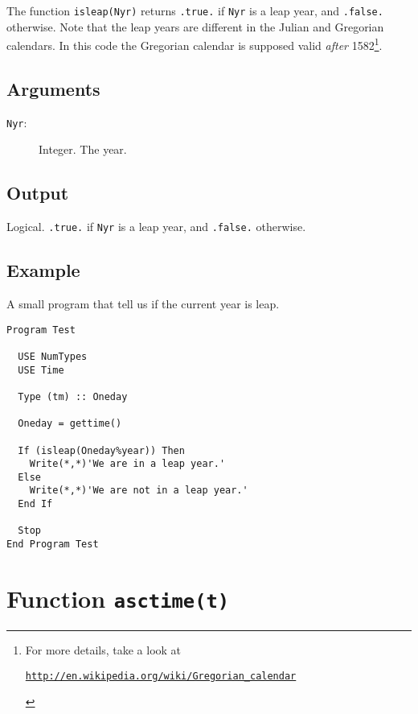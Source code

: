 The function \texttt{isleap(Nyr)} returns \texttt{.true.} if \texttt{Nyr}
is a leap year, and \texttt{.false.} otherwise. Note that the leap
years are different in the Julian and Gregorian calendars. In this
code the Gregorian calendar is supposed valid \emph{after} 1582\footnote{For
more details, take a look at 
\begin{center}
\href{http://en.wikipedia.org/wiki/Gregorian_calendar}{\texttt{http://en.wikipedia.org/wiki/Gregorian\_calendar}}  
\end{center}
}. 

\subsection{Arguments}

\begin{description}
\item[\texttt{Nyr}: ] Integer. The year.
\end{description}

\subsection{Output}

Logical.  \texttt{.true.} if \texttt{Nyr} is a leap year, and
\texttt{.false.} otherwise. 

\subsection{Example}

A small program that tell us if the current year is leap.

\begin{lstlisting}[emph=isleap,
                   emphstyle=\color{blue},
                   frame=trBL,
                   caption=Are we in a leap year?.,
                   label=isleap]
Program Test

  USE NumTypes
  USE Time

  Type (tm) :: Oneday

  Oneday = gettime()

  If (isleap(Oneday%year)) Then
    Write(*,*)'We are in a leap year.'
  Else
    Write(*,*)'We are not in a leap year.'
  End If

  Stop
End Program Test
\end{lstlisting}

\section{Function \texttt{asctime(t)}}

